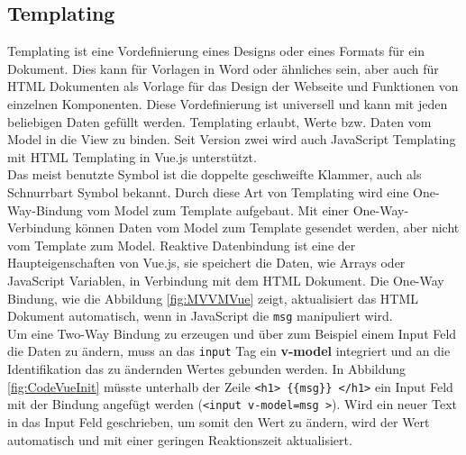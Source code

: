 \subsection*{Templating}
Templating ist eine Vordefinierung eines Designs oder eines Formats f\"ur ein Dokument. Dies kann f\"ur Vorlagen in Word oder \"ahnliches sein, aber auch f\"ur \ac{HTML} Dokumenten als Vorlage f\"ur das Design der Webseite und Funktionen von einzelnen Komponenten. Diese Vordefinierung ist universell und kann mit jeden beliebigen Daten gef\"ullt werden\cite{DictionaryTemplating}. Templating erlaubt, Werte bzw. Daten vom Model in die View zu binden. Seit Version zwei wird auch JavaScript Templating mit \ac{HTML} Templating in Vue.js unterst\"utzt. \\
Das meist benutzte Symbol ist die doppelte geschweifte Klammer, auch als Schnurrbart Symbol bekannt. Durch diese Art von Templating wird eine One-Way-Bindung vom Model zum Template aufgebaut. Mit einer One-Way-Verbindung k\"onnen Daten vom Model zum Template gesendet werden, aber nicht vom Template zum Model\cite{AlligatorTemplating2016}.
Reaktive Datenbindung ist eine der Haupteigenschaften von Vue.js, sie speichert die Daten, wie Arrays oder JavaScript Variablen, in Verbindung mit dem \ac{HTML} Dokument. Die One-Way Bindung, wie die Abbildung \ref{fig:MVVMVue} zeigt, aktualisiert das \ac{HTML} Dokument automatisch, wenn in JavaScript die \texttt{msg} manipuliert wird.\\
 Um eine Two-Way Bindung zu erzeugen und \"uber zum Beispiel einem Input Feld die Daten zu \"andern, muss an das \texttt{input} Tag ein \textbf{v-model} integriert und an die Identifikation das zu \"andernden Wertes gebunden werden. In Abbildung \ref{fig:CodeVueInit} m\"usste unterhalb der Zeile \texttt{<h1> \{\{msg\}\} </h1>} ein Input Feld mit der Bindung angef\"ugt werden (\texttt{<input v-model=\grqq msg \grqq>})\cite{Gore2016}. Wird ein neuer Text in das Input Feld geschrieben, um somit den Wert zu \"andern, wird der Wert automatisch und mit einer geringen Reaktionszeit aktualisiert.

